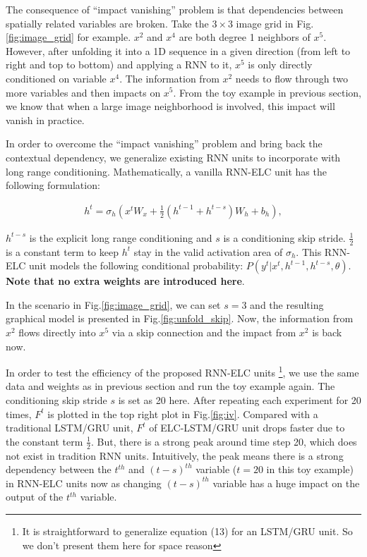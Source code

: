 \documentclass[10pt,twocolumn,letterpaper]{article}
\begin{document}
The consequence of  ``impact vanishing'' problem is that dependencies between spatially related variables are broken. Take the $3\times3$ image grid in Fig.\ref{fig:image_grid} for example. $x^2$ and $x^4$ are both degree 1 neighbors of $x^5$. However, after unfolding it into a 1D sequence in a given direction (from left to right and top to bottom) and applying a RNN to it, $x^5$ is only directly conditioned on variable $x^4$. The information from $x^2$ needs to flow through two more variables and then impacts on $x^5$. From the toy example in previous section, we know that when a large image neighborhood is involved, this impact will vanish in practice.

In order to overcome the ``impact vanishing'' problem and bring back the contextual dependency, we generalize existing RNN units to incorporate with long range conditioning. Mathematically, a vanilla RNN-ELC unit has the following formulation:

\begin{gather}
  h^{t} = \sigma_{h}({x^{t}W_x +  \frac{1}{2} (h^{t-1} + h^{t-s})W_h+b_h} ),
 \label{rnn_elc}
\end{gather}

\noindent
$h^{t-s}$ is the explicit long range conditioning and $s$ is a conditioning skip stride. $\frac{1}{2}$ is a constant term to keep $h^t$ stay in the valid activation area of $\sigma_{h}$. This RNN-ELC unit models the following conditional probability: $P(y^t| x^t, h^{t-1}, h^{t-s}, \theta)$. \textbf{Note that no extra weights are introduced here}.

In the scenario in Fig.\ref{fig:image_grid}, we can set $s=3$ and the resulting graphical model is presented in Fig.\ref{fig:unfold_skip}. Now, the information from $x^2$ flows directly into $x^5$ via a skip connection and the impact from $x^2$ is back now.  



In order to test the efficiency of the proposed RNN-ELC units \footnote{It is straightforward to generalize equation (13) for an LSTM/GRU unit. So we don't present them here for space reason}, we use the same data and weights as in previous section and run the toy example again. The conditioning skip stride $s$ is set as 20 here. After repeating each experiment for 20 times, $F^t$ is plotted in the top right plot in Fig.\ref{fig:iv}. Compared with a traditional LSTM/GRU unit, $F^t$ of ELC-LSTM/GRU unit drops faster due to the constant term $\frac{1}{2}$. But, there is a strong peak around time step 20, which does not exist in tradition RNN units. Intuitively, the peak means there is a strong dependency between the $t^{th}$ and $(t-s)^{th}$ variable ($t=20$ in this toy example) in RNN-ELC units now as changing $(t-s)^{th}$ variable has a huge impact on the output of the $t^{th}$ variable.
\end{document}
